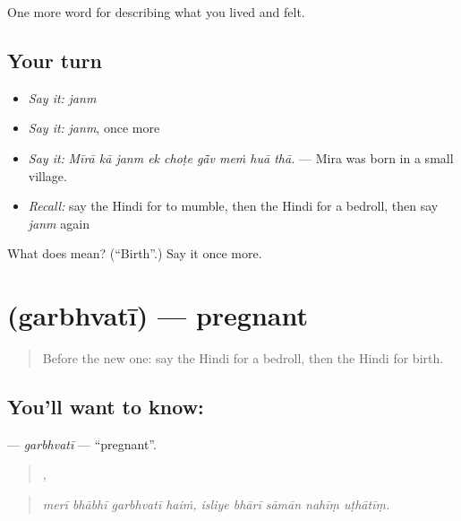 \begin{grammarlens}[title={What you've built}]
One more word for describing what you lived and felt.
\end{grammarlens}

\subsection*{Your turn}
\begin{itemize}
\raggedright
  \item \emph{Say it:} \emph{janm}
  \item \emph{Say it:} \emph{janm}, once more
  \item \emph{Say it:} \emph{Mīrā kā janm ek choṭe gā̃v meṁ huā thā.} — Mira was born in a small village.
  \item \emph{Recall:} say the Hindi for to mumble, then the Hindi for a bedroll, then say \emph{janm} again
\end{itemize}

\begin{tcolorbox}[breakable,colback=teal!4,colframe=teal!35!black,title={Before you move on}]
What does  mean? (\textquotedblleft{}Birth\textquotedblright{}.) Say it once more.
\end{tcolorbox}
\section[\texorpdfstring{\hi{गर्भवती} (garbhvatī)}{गर्भवती (garbhvatī)}]{ (garbhvatī) — pregnant}

\label{lesson:HI-C497-garbhvati}



\begin{quote}
Before the new one: say the Hindi for a bedroll, then the Hindi for birth.
\end{quote}

\subsection*{You'll want to know: }
\textbf{} — \emph{garbhvatī} — \textquotedblleft{}pregnant\textquotedblright{}.

\begin{quote}
   ,     
\end{quote}

\begin{quote}
\emph{merī bhābhī garbhvatī haiṁ, isliye bhārī sāmān nahīṃ uṭhātīṃ.}
\end{quote}

